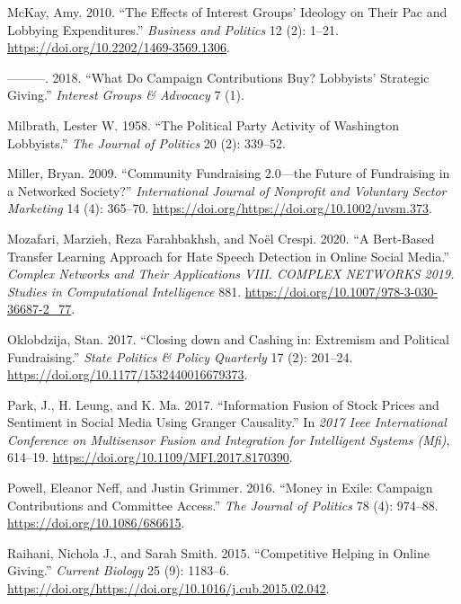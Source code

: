 \documentclass[12pt,]{article}
\begin{document}
\leavevmode\hypertarget{ref-mckay2010}{}%
McKay, Amy. 2010. ``The Effects of Interest Groups' Ideology on Their
Pac and Lobbying Expenditures.'' \emph{Business and Politics} 12 (2):
1--21. \url{https://doi.org/10.2202/1469-3569.1306}.

\leavevmode\hypertarget{ref-mckay2018}{}%
---------. 2018. ``What Do Campaign Contributions Buy? Lobbyists'
Strategic Giving.'' \emph{Interest Groups \& Advocacy} 7 (1).

\leavevmode\hypertarget{ref-milbrath1958}{}%
Milbrath, Lester W. 1958. ``The Political Party Activity of Washington
Lobbyists.'' \emph{The Journal of Politics} 20 (2): 339--52.

\leavevmode\hypertarget{ref-miller2009}{}%
Miller, Bryan. 2009. ``Community Fundraising 2.0---the Future of
Fundraising in a Networked Society?'' \emph{International Journal of
Nonprofit and Voluntary Sector Marketing} 14 (4): 365--70.
\url{https://doi.org/https://doi.org/10.1002/nvsm.373}.

\leavevmode\hypertarget{ref-mozafari2020}{}%
Mozafari, Marzieh, Reza Farahbakhsh, and Noël Crespi. 2020. ``A
Bert-Based Transfer Learning Approach for Hate Speech Detection in
Online Social Media.'' \emph{Complex Networks and Their Applications
VIII. COMPLEX NETWORKS 2019. Studies in Computational Intelligence} 881.
\url{https://doi.org/10.1007/978-3-030-36687-2_77}.

\leavevmode\hypertarget{ref-oklobdzija2017}{}%
Oklobdzija, Stan. 2017. ``Closing down and Cashing in: Extremism and
Political Fundraising.'' \emph{State Politics \& Policy Quarterly} 17
(2): 201--24. \url{https://doi.org/10.1177/1532440016679373}.

\leavevmode\hypertarget{ref-park2017}{}%
Park, J., H. Leung, and K. Ma. 2017. ``Information Fusion of Stock
Prices and Sentiment in Social Media Using Granger Causality.'' In
\emph{2017 Ieee International Conference on Multisensor Fusion and
Integration for Intelligent Systems (Mfi)}, 614--19.
\url{https://doi.org/10.1109/MFI.2017.8170390}.

\leavevmode\hypertarget{ref-powell2016}{}%
Powell, Eleanor Neff, and Justin Grimmer. 2016. ``Money in Exile:
Campaign Contributions and Committee Access.'' \emph{The Journal of
Politics} 78 (4): 974--88. \url{https://doi.org/10.1086/686615}.

\leavevmode\hypertarget{ref-raihani2015}{}%
Raihani, Nichola J., and Sarah Smith. 2015. ``Competitive Helping in
Online Giving.'' \emph{Current Biology} 25 (9): 1183--6.
\url{https://doi.org/https://doi.org/10.1016/j.cub.2015.02.042}.
\end{document}
